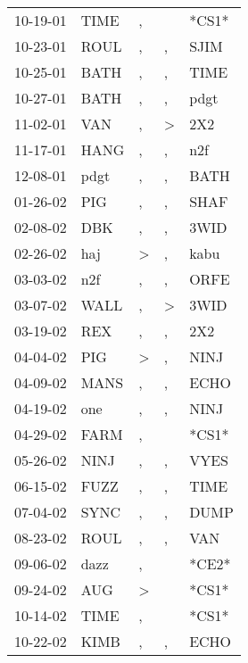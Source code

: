 \begin{supertabular}{lllll}
 10-19-01 &   TIME &             , &               &  *CS1* \\
 10-23-01 &   ROUL &             , &             , &   SJIM \\
 10-25-01 &   BATH &             , &             , &   TIME \\
 10-27-01 &   BATH &             , &             , &   pdgt \\
 11-02-01 &    VAN &             , &  \textgreater &    2X2 \\
 11-17-01 &   HANG &             , &             , &    n2f \\
 12-08-01 &   pdgt &             , &             , &   BATH \\
 01-26-02 &    PIG &             , &             , &   SHAF \\
 02-08-02 &    DBK &             , &             , &   3WID \\
 02-26-02 &    haj &  \textgreater &             , &   kabu \\
 03-03-02 &    n2f &             , &             , &   ORFE \\
 03-07-02 &   WALL &             , &  \textgreater &   3WID \\
 03-19-02 &    REX &             , &             , &    2X2 \\
 04-04-02 &    PIG &  \textgreater &             , &   NINJ \\
 04-09-02 &   MANS &             , &             , &   ECHO \\
 04-19-02 &    one &             , &             , &   NINJ \\
 04-29-02 &   FARM &             , &               &  *CS1* \\
 05-26-02 &   NINJ &             , &             , &   VYES \\
 06-15-02 &   FUZZ &             , &             , &   TIME \\
 07-04-02 &   SYNC &             , &             , &   DUMP \\
 08-23-02 &   ROUL &             , &             , &    VAN \\
 09-06-02 &   dazz &             , &               &  *CE2* \\
 09-24-02 &    AUG &  \textgreater &               &  *CS1* \\
 10-14-02 &   TIME &             , &               &  *CS1* \\
 10-22-02 &   KIMB &             , &             , &   ECHO \\

\end{supertabular}
